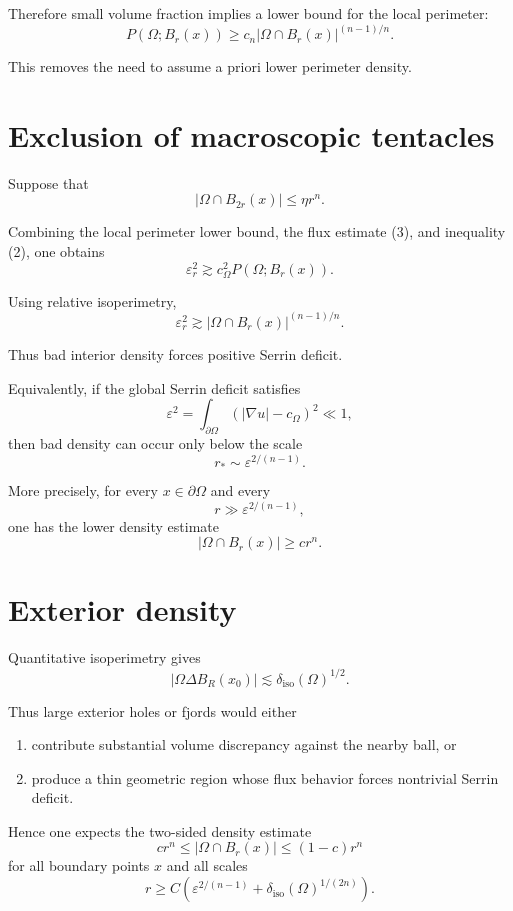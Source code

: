 \documentclass[11pt]{article}
\newcommand{\eps}{\varepsilon}
\newcommand{\deliso}{\delta_{\mathrm{iso}}}
\begin{document}
Therefore small volume fraction implies a lower bound
for the local perimeter:
\[
P(\Omega;B_r(x))
\ge
c_n |\Omega\cap B_r(x)|^{(n-1)/n}.
\]

This removes the need to assume a priori lower perimeter density.

\section{Exclusion of macroscopic tentacles}

Suppose that
\[
|\Omega\cap B_{2r}(x)|
\le
\eta r^n.
\]

Combining the local perimeter lower bound,
the flux estimate (3),
and inequality (2),
one obtains
\[
\eps_r^2
\gtrsim
c_\Omega^2
P(\Omega;B_r(x)).
\]

Using relative isoperimetry,
\[
\eps_r^2
\gtrsim
|\Omega\cap B_r(x)|^{(n-1)/n}.
\]

Thus bad interior density forces positive Serrin deficit.

Equivalently,
if the global Serrin deficit satisfies
\[
\eps^2
=
\int_{\partial\Omega}
(|\nabla u|-c_\Omega)^2
\ll1,
\]
then bad density can occur only below the scale
\[
r_*
\sim
\eps^{2/(n-1)}.
\]

More precisely, for every $x\in\partial\Omega$ and every
\[
r\gg \eps^{2/(n-1)},
\]
one has the lower density estimate
\[
|\Omega\cap B_r(x)|
\ge
c r^n.
\]

\section{Exterior density}

Quantitative isoperimetry gives
\[
|\Omega\Delta B_R(x_0)|
\lesssim
\deliso(\Omega)^{1/2}.
\]

Thus large exterior holes or fjords would either

\begin{enumerate}[label=(\roman*)]
\item contribute substantial volume discrepancy against the nearby ball,
or
\item produce a thin geometric region whose flux behavior forces
nontrivial Serrin deficit.
\end{enumerate}

Hence one expects the two-sided density estimate
\[
c r^n
\le
|\Omega\cap B_r(x)|
\le
(1-c)r^n
\]
for all boundary points $x$ and all scales
\[
r
\ge
C
\left(
\eps^{2/(n-1)}
+
\deliso(\Omega)^{1/(2n)}
\right).
\]
\end{document}

